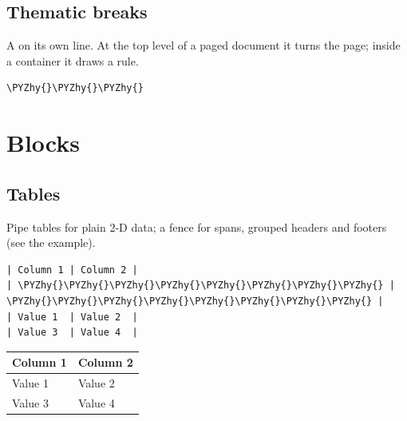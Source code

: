 \documentclass[a4paper,twoside]{article}
\begin{document}
\subsection{Thematic breaks}
A \tscodeinline{-\allowbreak{}-\allowbreak{}-\allowbreak{}} on its own line. At the top level of a paged document it turns the page; inside a container it draws a rule.
\begin{tscode}[lang=md, engine=pygments]
\begin{Verbatim}[commandchars=\\\{\},breaklines, breakanywhere, commandchars=\\\{\}]
\PYZhy{}\PYZhy{}\PYZhy{}
\end{Verbatim}
\end{tscode}
\begin{displayquote}
\tsrule
\end{displayquote}
\section{Blocks}
\subsection{Tables}
Pipe tables for plain 2-D data; a  fence for spans, grouped headers and footers (see the  example).
\begin{tscode}[lang=md, engine=pygments]
\begin{Verbatim}[commandchars=\\\{\},breaklines, breakanywhere, commandchars=\\\{\}]
| Column 1 | Column 2 |
| \PYZhy{}\PYZhy{}\PYZhy{}\PYZhy{}\PYZhy{}\PYZhy{}\PYZhy{}\PYZhy{} | \PYZhy{}\PYZhy{}\PYZhy{}\PYZhy{}\PYZhy{}\PYZhy{}\PYZhy{}\PYZhy{} |
| Value 1  | Value 2  |
| Value 3  | Value 4  |
\end{Verbatim}
\end{tscode}
\begin{displayquote}
\begin{center}
\begin{tabularx}{\linewidth}{>{\raggedright\arraybackslash}X>{\raggedright\arraybackslash}X}
\toprule
\textbf{Column 1} & \textbf{Column 2} \\
\midrule
Value 1 & Value 2 \\
Value 3 & Value 4 \\
\bottomrule
\end{tabularx}
\end{center}
\end{displayquote}
\end{document}
